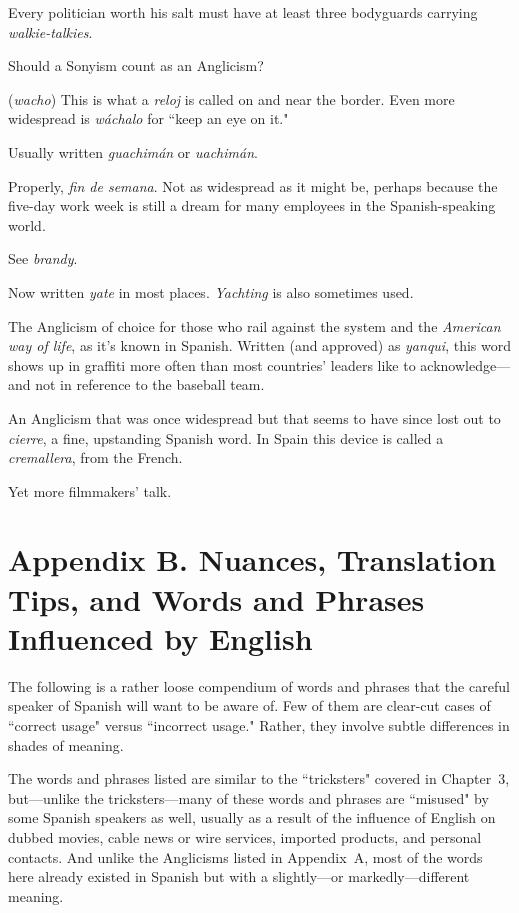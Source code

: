  Every politician worth his salt must have at
least three bodyguards carrying \emph{walkie-talkies}.

 Should a Sonyism count as an Anglicism?

 (\emph{wacho}) This is what a \emph{reloj} is called on and near the
border. Even more widespread is \emph{wáchalo} for ``keep an eye on it."

 Usually written \emph{guachimán} or \emph{uachimán}.

 Properly, \emph{fin de semana}. Not as widespread as it
might be, perhaps because the five-day work week is still a dream for
many employees in the Spanish-speaking world.

 See \emph{brandy}.

 Now written \emph{yate} in most places. \emph{Yachting} is also
sometimes used.

 The Anglicism of choice for those who rail against
the system and the \emph{American way of life}, as it's known in Spanish.
Written (and approved) as \emph{yanqui}, this word shows up in graffiti more
often than most countries' leaders like to acknowledge---and not in
reference to the baseball team.

 An Anglicism that was once widespread but that
seems to have since lost out to \emph{cierre}, a fine, upstanding Spanish
word. In Spain this device is called a \emph{cremallera}, from the French.

 Yet more filmmakers' talk.

\chapter{Appendix B. Nuances, Translation Tips, and Words and Phrases Influenced by English}

The following is a rather loose compendium of words and
phrases that the careful speaker of Spanish will want to be aware of.
Few of them are clear-cut cases of ``correct usage" versus ``incorrect usage." Rather, they involve subtle differences in shades of meaning.

The words and phrases listed are similar to the ``tricksters"
covered in Chapter~3, but---unlike the tricksters---many of these words
and phrases are ``misused" by some Spanish speakers as well, usually
as a result of the influence of English on dubbed movies, cable news
or wire services, imported products, and personal contacts. And unlike the Anglicisms listed in Appendix~A, most of the words here already
existed in Spanish but with a slightly---or markedly---different meaning.

